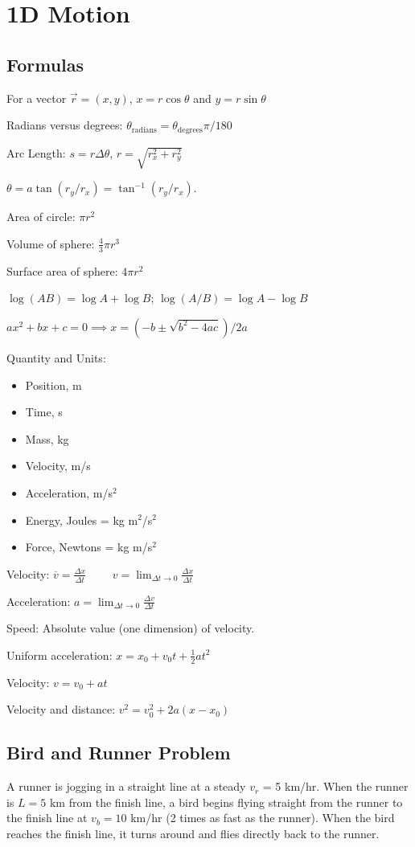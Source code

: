 \documentclass[../physics12.tex]{subfiles}
\begin{document}
\chapter{1D Motion}
\section{Formulas}
For a vector $\vec{r}=(x,y)$, $x=r\cos\theta$ and $y=r\sin\theta$

Radians versus degrees: $\theta_{\text{radians}}=\theta_{\text{degrees}}\pi/180$

Arc Length: $s=r\Delta \theta$, $r=\sqrt{r_x^2+r_y^2}$

$\theta = a\tan(r_y/r_x) = \tan^{-1}(r_y/r_x)$. 

Area of circle: $\pi r^2$

Volume of sphere: $\frac{4}{3}\pi r^3$

Surface area of sphere: $4\pi r^2$

$\log(AB)=\log A + \log B$; $\log(A/B)=\log A-\log B$

$ax^2+bx+c = 0 \implies x = (-b\pm \sqrt{b^2-4ac})/2a$

Quantity and Units:
\begin{itemize}
    \item Position, m 
    \item Time, s 
    \item Mass, kg 
    \item Velocity, m/s 
    \item Acceleration, m/s$^2$
    \item Energy, Joules = kg m$^2$/s$^2$
    \item Force, Newtons = kg m/s$^2$
\end{itemize}

Velocity: $\overline{v}=\frac{\Delta x}{\Delta t} \qquad $ $v=\lim_{\Delta t \to 0}\frac{\Delta x}{\Delta t}$

Acceleration: $a = \lim_{\Delta t \to 0}\frac{\Delta v}{\Delta t}$

Speed: Absolute value (one dimension) of velocity. 

Uniform acceleration: $x=x_0+v_0t+\frac{1}{2}at^2$

Velocity: $v=v_0+at$

Velocity and distance: $v^2=v_0^2+2a(x-x_0)$
\section{Bird and Runner Problem}
A runner is jogging in a straight line at a steady $v_r$ = 5 km/hr. When the runner is $L=5$ km from the finish line, 
a bird begins flying straight from the runner to the finish line at $v_b=10$ km/hr (2 times as fast as the runner). When the bird reaches 
the finish line, it turns around and flies directly back to the runner.
\end{document}
